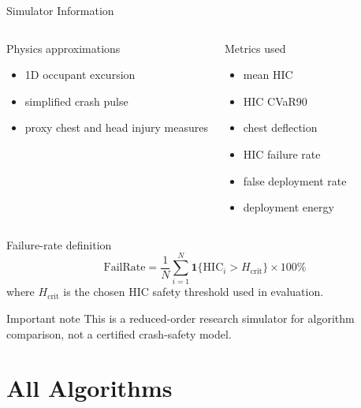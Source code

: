 \documentclass[aspectratio=169]{beamer}
\begin{document}
\begin{frame}{Simulator Information}
  \begin{columns}[T]
    \begin{block}{Physics approximations}
      \begin{itemize}
        \item 1D occupant excursion
        \item simplified crash pulse
        \item proxy chest and head injury measures
      \end{itemize}
    \end{block}

    \begin{block}{Metrics used}
      \begin{itemize}
        \item mean HIC
        \item HIC CVaR90
        \item chest deflection
        \item HIC failure rate
        \item false deployment rate
        \item deployment energy
      \end{itemize}
    \end{block}
  \end{columns}

  \vspace{0.2em}
  \begin{block}{Failure-rate definition}
    \[
    \mathrm{FailRate} = \frac{1}{N}\sum_{i=1}^{N}\mathbf{1}\{\mathrm{HIC}_i > H_{\mathrm{crit}}\}\times 100\%
    \]
    where \(H_{\mathrm{crit}}\) is the chosen HIC safety threshold used in evaluation.
  \end{block}

  \vspace{0.4em}
  \begin{alertblock}{Important note}
    This is a reduced-order research simulator for algorithm comparison, not a certified crash-safety model.
  \end{alertblock}
\end{frame}

\section{All Algorithms}
\end{document}
